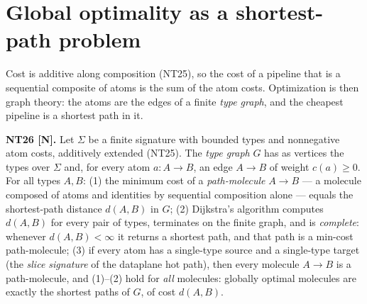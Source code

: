\section{Global optimality as a shortest-path problem}\label{sec:enrich-shortest}

Cost is additive along composition (NT25), so the cost of a pipeline that is a
sequential composite of atoms is the sum of the atom costs. Optimization is
then graph theory: the atoms are the edges of a finite \emph{type graph}, and
the cheapest pipeline is a shortest path in it.

\begin{theorem}\label{nt:26}
\textbf{NT26 [N].} Let $\Sigma$ be a finite signature with bounded types and
nonnegative atom costs, additively extended (NT25). The \emph{type graph} $G$
has as vertices the types over $\Sigma$ and, for every atom
$a \colon A \to B$, an edge $A \to B$ of weight $c(a) \ge 0$. For all types
$A, B$:
(1) the minimum cost of a \emph{path-molecule} $A \to B$ --- a molecule
composed of atoms and identities by sequential composition alone --- equals
the shortest-path distance $d(A,B)$ in $G$;
(2) Dijkstra's algorithm computes $d(A,B)$ for every pair of types, terminates
on the finite graph, and is \emph{complete}: whenever $d(A,B) < \infty$ it
returns a shortest path, and that path is a min-cost path-molecule;
(3) if every atom has a single-type source and a single-type target (the
\emph{slice signature} of the dataplane hot path), then every molecule
$A \to B$ is a path-molecule, and (1)--(2) hold for \emph{all} molecules:
globally optimal molecules are exactly the shortest paths of $G$, of cost
$d(A,B)$.
\end{theorem}

